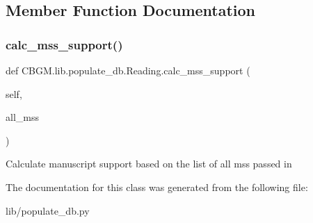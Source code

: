 \subsection{Member Function Documentation}
\mbox{\label{classCBGM_1_1lib_1_1populate__db_1_1Reading_a296d86f9765cb12979a79917d1473f16}} 
\subsubsection{\texorpdfstring{calc\+\_\+mss\+\_\+support()}{calc\_mss\_support()}}
{\footnotesize\ttfamily def C\+B\+G\+M.\+lib.\+populate\+\_\+db.\+Reading.\+calc\+\_\+mss\+\_\+support (\begin{DoxyParamCaption}\item[{}]{self,  }\item[{}]{all\+\_\+mss }\end{DoxyParamCaption})}

\begin{DoxyVerb}Calculate manuscript support based on the list of all mss passed in
\end{DoxyVerb}
 

The documentation for this class was generated from the following file\+:\begin{DoxyCompactItemize}
\item 
lib/populate\+\_\+db.\+py\end{DoxyCompactItemize}
